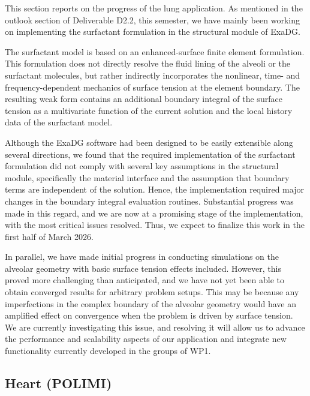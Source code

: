 \documentclass[a4paper,12pt]{article}
\begin{document}
This section reports on the progress of the lung application. As mentioned in the outlook section of Deliverable D2.2, this semester, we have mainly been working on implementing the surfactant formulation in the structural module of ExaDG.

The surfactant model is based on an enhanced-surface finite element formulation. This formulation does not directly resolve the fluid lining of the alveoli or the surfactant molecules, but rather indirectly incorporates the nonlinear, time- and frequency-dependent mechanics of surface tension at the element boundary. The resulting weak form contains an additional boundary integral of the surface tension as a multivariate function of the current solution and the local history data of the surfactant model.

Although the ExaDG software had been designed to be easily extensible along several directions, we found that the required implementation of the surfactant formulation did not comply with several key assumptions in the structural module, specifically the material interface and the assumption that boundary terms are independent of the solution. Hence, the implementation required major changes in the boundary integral evaluation routines. Substantial progress was made in this regard, and we are now at a promising stage of the implementation, with the most critical issues resolved. Thus, we expect to finalize this work in the first half of March 2026.

In parallel, we have made initial progress in conducting simulations on the alveolar geometry with basic surface tension effects included. However, this proved more challenging than anticipated, and we have not yet been able to obtain converged results for arbitrary problem setups. This may be because any imperfections in the complex boundary of the alveolar geometry would have an amplified effect on convergence when the problem is driven by surface tension. We are currently investigating this issue, and resolving it will allow us to advance the performance and scalability aspects of our application and integrate new functionality currently developed in the groups of WP1.



\subsection{Heart (POLIMI)}
\end{document}
